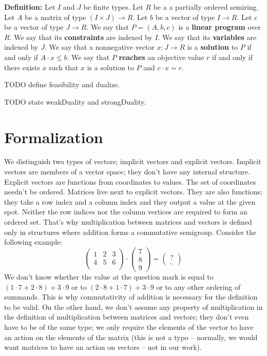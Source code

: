 \documentclass[]{article}
\renewcommand{\.}{\hskip .75pt}
\let\r=\rightarrow
\let\*=\cdot
\begin{document}
\medskip \noindent
\textbf{Definition:}
Let $I$ and $J$ be finite types.
Let $R$ be a a partially ordered semiring.
Let $A$ be a matrix of type $(I \times J) \r R$.
Let $b$ be a vector of type $I \r R$.
Let $c$ be a vector of type $J \r R$.
We say that $P = (A, b, c)$ is a \textbf{linear program} over $R$.
We say that its \textbf{constraints} are indexed by $I$.
We say that its \textbf{variables} are indexed by $J$.
We say that a nonnegative vector $x : J \r R$ is
a \textbf{solution} to $P$ if and only if $A \* x \le b$.
We say that $P$ \textbf{reaches} an objective value $r$
if and only if there exists $x$ such that $x$ is a solution to $P$
and $c \* x = r$.

TODO define feasibility and dualize.

TODO state weakDuality and strongDuality.

\section{Formalization}

We distinguish two types of vectors; implicit vectors and explicit vectors.
Implicit vectors are members of a vector space; they don't have any internal structure.
Explicit vectors are functions from coordinates to values.
The set of coordinates needn't be ordered.
Matrices live next to explicit vectors. They are also functions; they take a row index
and a column index and they output a value at the given spot.
Neither the row indices nor the column vertices are required to form an ordered set.
That's why multiplication between matrices and vectors is defined only in structures
where addition forms a commutative semigroup. Consider the following example:
$$
\begin{pmatrix}
	1 & 2 & 3 \\
	4 & 5 & 6 \\
\end{pmatrix}
\*
\begin{pmatrix}
	7 \\ 8 \\ 9
\end{pmatrix}
=
\begin{pmatrix}
	? \\ \_
\end{pmatrix}
$$
We don't know whether the value at the question mark is equal to
$ (1 \* 7 + 2 \* 8) + 3 \* 9 $ or to
$ (2 \* 8 + 1 \* 7) + 3 \* 9 $ or to
any other ordering of summands.
This is why commutativity of addition is necessary for the definition to be valid.
On the other hand, we don't assume any property of multiplication in the
definition of multiplication between matrices and vectors; they don't even
have to be of the same type; we only require the elements of the vector
to have an action on the elements of the matrix (this is not a typo -- normally,
we would want matrices to have an action on vectors -- not in our work).
\end{document}
